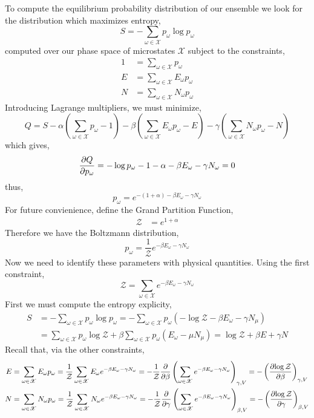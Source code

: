 \documentclass[12pt]{article}
\begin{document}
To compute the equilibrium probability distribution of our ensemble we look for the distribution which maximizes entropy,
\[ S = - \sum_{\omega \in \mathscr{X}} p_\omega \log{p_\omega} \]
computed over our phase space of microstates $\mathscr{X}$ subject to the constraints,
\begin{align*}
1 & = \sum_{\omega \in \mathscr{X}} p_\omega
\\
E & = \sum_{\omega \in \mathscr{X}} E_\omega p_\omega 
\\
N & = \sum_{\omega \in \mathscr{X}} N_\omega p_\omega 
\end{align*}
Introducing Lagrange multipliers, we must minimize,
\[ Q = S - \alpha \left( \sum_{\omega \in \mathscr{X}} p_\omega - 1 \right) - \beta \left( \sum_{\omega \in \mathscr{X}} E_\omega p_\omega  - E \right) - \gamma \left(  \sum_{\omega \in \mathscr{X}} N_\omega p_\omega  - N  \right) \]
which gives,
\[ \frac{\partial{Q}}{\partial{p_\omega}} = - \log{p_\omega} - 1 - \alpha - \beta E_\omega - \gamma N_\omega = 0 \]
thus,
\[ p_\omega = e^{-(1 + \alpha) -\beta E_\omega - \gamma N_\omega} \]  
For future convienience, define the Grand Partition Function,
\begin{align*}
\mathcal{Z} & = e^{1 + \alpha}
\end{align*} 
Therefore we have the Boltzmann distribution,
\[ p_\omega = \frac{1}{\mathcal{Z}} e^{- \beta E_\omega - \gamma N_\omega} \]
Now we need to identify these parameters with physical quantities. Using the first constraint,
\[ \mathcal{Z} = \sum_{\omega \in \mathscr{X}} e^{-\beta E_\omega - \gamma N_\omega} \]
First we must compute the entropy explicity,
\begin{align*}
S & = -\sum_{\omega \in \mathscr{X}}  p_\omega  \log{ p_\omega } = - \sum_{\omega \in \mathscr{X}} p_\omega \left( - \log{\mathcal{Z}} - \beta E_\omega - \gamma N_\mu \right)
\\
& = \sum_{\omega \in \mathscr{X}} p_\omega \log{\mathcal{Z}} + \beta \sum_{\omega \in \mathscr{X}} p_\omega  ( E_\omega - \mu N_\mu) = \log{\mathcal{Z}} + \beta E + \gamma N 
\end{align*}
Recall that, via the other constraints,
\begin{align*}
E & = \sum_{\omega \in \mathscr{X}} E_\omega p_\omega = \frac{1}{\mathcal{Z}} \sum_{\omega \in \mathscr{X}} E_\omega e^{-\beta E_\omega - \gamma N_\omega} = -  \frac{1}{\mathcal{Z}} \frac{\partial{}}{\partial{\beta}} \left( \sum_{\omega \in \mathscr{X}} e^{-\beta E_\omega - \gamma N_\omega} \right)_{\gamma, V}  = - \left( \frac{\partial{\log{\mathcal{Z}}}}{\partial{\beta}} \right)_{\gamma, V}
\\
N & = \sum_{\omega \in \mathscr{X}} N_\omega p_\omega = \frac{1}{\mathcal{Z}} \sum_{\omega \in \mathscr{X}} N_\omega e^{-\beta E_\omega - \gamma N_\omega} = - \frac{1}{\mathcal{Z}} \frac{\partial{}}{\partial{\gamma}} \left( \sum_{\omega \in \mathscr{X}} e^{-\beta E_\omega - \gamma N_\omega} \right)_{\beta, V}  = - \left( \frac{\partial{\log{\mathcal{Z}}}}{\partial{\gamma}} \right)_{\beta, V}
\end{align*} 
\end{document}
